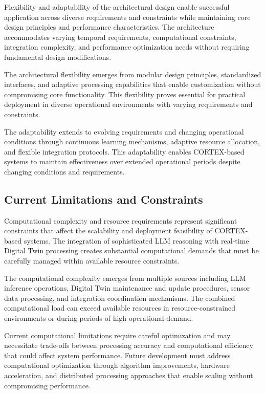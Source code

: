 Flexibility and adaptability of the architectural design enable successful application across diverse requirements and constraints while maintaining core design principles and performance characteristics. The architecture accommodates varying temporal requirements, computational constraints, integration complexity, and performance optimization needs without requiring fundamental design modifications.

The architectural flexibility emerges from modular design principles, standardized interfaces, and adaptive processing capabilities that enable customization without compromising core functionality. This flexibility proves essential for practical deployment in diverse operational environments with varying requirements and constraints.

The adaptability extends to evolving requirements and changing operational conditions through continuous learning mechanisms, adaptive resource allocation, and flexible integration protocols. This adaptability enables CORTEX-based systems to maintain effectiveness over extended operational periods despite changing conditions and requirements.

\subsection{Current Limitations and Constraints}

Computational complexity and resource requirements represent significant constraints that affect the scalability and deployment feasibility of CORTEX-based systems. The integration of sophisticated LLM reasoning with real-time Digital Twin processing creates substantial computational demands that must be carefully managed within available resource constraints.

The computational complexity emerges from multiple sources including LLM inference operations, Digital Twin maintenance and update procedures, sensor data processing, and integration coordination mechanisms. The combined computational load can exceed available resources in resource-constrained environments or during periods of high operational demand.

Current computational limitations require careful optimization and may necessitate trade-offs between processing accuracy and computational efficiency that could affect system performance. Future development must address computational optimization through algorithm improvements, hardware acceleration, and distributed processing approaches that enable scaling without compromising performance.

